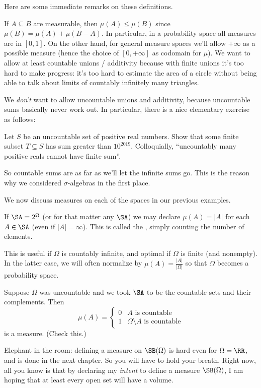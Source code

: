 \begin{remark}
Here are some immediate remarks on these definitions.
\begin{itemize}
	\ii If $A \subseteq B$ are measurable,
	then $\mu(A) \le \mu(B)$ since $\mu(B) = \mu(A) + \mu(B-A)$.
	\ii In particular, in a probability space all measures are in $[0,1]$.
	On the other hand, for general measure spaces we'll allow $+\infty$
	as a possible measure
	(hence the choice of $[0,+\infty]$ as codomain for $\mu$).
	\ii We want to allow at least countable unions / additivity
	because with finite unions it's too hard to make progress:
	it's too hard to estimate the area of a circle
	without being able to talk about limits of countably infinitely many triangles.
	\end{itemize}
\end{remark}
We \emph{don't} want to allow uncountable unions and additivity,
because uncountable sums basically never work out.
In particular, there is a nice elementary exercise as follows:
\begin{exercise}
	[Tricky]
	Let $S$ be an uncountable set of positive real numbers.
	Show that some finite subset $T \subseteq S$ has sum greater than $10^{2019}$.
	Colloquially, ``uncountably many positive reals cannot have finite sum''.
\end{exercise}
So countable sums are as far as we'll let the infinite sums go.
This is the reason why we considered $\sigma$-algebras in the first place.


\begin{example}
	[Measures]
	We now discuss measures on each of the spaces
	in our previous examples.
	\begin{enumerate}[(a)]
		\ii If $\SA = 2^\Omega$ (or for that matter any $\SA$)
		we may declare $\mu(A) = |A|$ for each $A \in \SA$
		(even if $|A| = \infty$).
		This is called the ,
		simply counting the number of elements.

		This is useful if $\Omega$ is countably infinite,
		and optimal if $\Omega$ is finite (and nonempty).
		In the latter case, we will often normalize by
		$\mu(A) = \frac{|A|}{|\Omega|}$
		so that $\Omega$ becomes a probability space.

		\ii Suppose $\Omega$ was uncountable
		and we took $\SA$ to be the countable sets and their complements.
		Then
		\[
			\mu(A) = \begin{cases}
				0 & \text{$A$ is countable} \\
				1 & \text{$\Omega \setminus A$ is countable}
			\end{cases}
		\]
		is a measure. (Check this.)

		\ii Elephant in the room:
		defining a measure on $\SB(\Omega)$ is hard even for $\Omega = \RR$,
		and is done in the next chapter.
		So you will have to hold your breath.
		Right now, all you know is that by declaring my \emph{intent}
		to define a measure $\SB(\Omega)$,
		I am hoping that at least every open set will have a volume.
	\end{enumerate}
\end{example}

